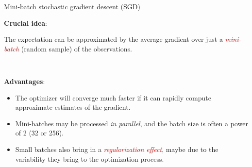\documentclass[
  10pt,
  ignorenonframetext,
]{beamer}
\providecommand{\tightlist}{%
  \setlength{\itemsep}{0pt}\setlength{\parskip}{0pt}}
\begin{document}
\begin{frame}
\begin{block}{Mini-batch stochastic gradient descent (SGD)}
\protect\hypertarget{mini-batch-stochastic-gradient-descent-sgd}{}
\(~\)

\textbf{Crucial idea}:

The expectation can be approximated by the average gradient over just a
\emph{\textcolor{red}{mini-batch}} (random sample) of the observations.

\(~\)

\textbf{Advantages}:

\vspace{1mm}

\begin{itemize}
\tightlist
\item
  The optimizer will converge much faster if it can rapidly compute
  approximate estimates of the gradient.
\end{itemize}

\vspace{1mm}

\begin{itemize}
\tightlist
\item
  Mini-batches may be processed \emph{in parallel}, and the batch size
  is often a power of 2 (32 or 256).
\end{itemize}

\vspace{1mm}

\begin{itemize}
\tightlist
\item
  Small batches also bring in a
  \emph{\textcolor{red}{regularization effect}}, maybe due to the
  variability they bring to the optimization process.
\end{itemize}
\end{block}
\end{frame}
\end{document}
